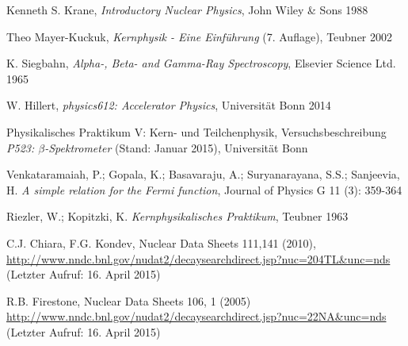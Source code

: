 \documentclass[11pt, a4paper]{article}
\numberwithin{equation}{section}
\begin{document}
\FloatBarrier
\vspace{\fill}
\begin{thebibliography}{19}

	Kenneth S. Krane,
	\emph{Introductory Nuclear Physics},
	John Wiley \& Sons 1988

	Theo Mayer-Kuckuk,
	\emph{Kernphysik - Eine Einführung} (7. Auflage),
	Teubner 2002

	K. Siegbahn,
	\emph{Alpha-, Beta- and Gamma-Ray Spectroscopy},
	Elsevier Science Ltd. 1965

	W. Hillert,
	\emph{physics612: Accelerator Physics},
	Universität Bonn 2014

	Physikalisches Praktikum V: Kern- und Teilchenphysik,
	Versuchsbeschreibung \emph{P523: $\beta$-Spektrometer} (Stand: Januar 2015),
	Universität Bonn	

	Venkataramaiah, P.; Gopala, K.; Basavaraju, A.; Suryanarayana, S.S.; Sanjeevia, H.
	\emph{A simple relation for the Fermi function},
	Journal of Physics G 11 (3): 359-364

	Riezler, W.; Kopitzki, K.
	\emph{Kernphysikalisches Praktikum},
	Teubner 1963

  C.J. Chiara, F.G. Kondev,
  Nuclear Data Sheets 111,141 (2010),
  \url{http://www.nndc.bnl.gov/nudat2/decaysearchdirect.jsp?nuc=204TL&unc=nds}
  (Letzter Aufruf: 16. April 2015)

  R.B. Firestone,
  Nuclear Data Sheets 106, 1 (2005)
  \url{http://www.nndc.bnl.gov/nudat2/decaysearchdirect.jsp?nuc=22NA&unc=nds}
  (Letzter Aufruf: 16. April 2015) 

\end{thebibliography}
\end{document}
